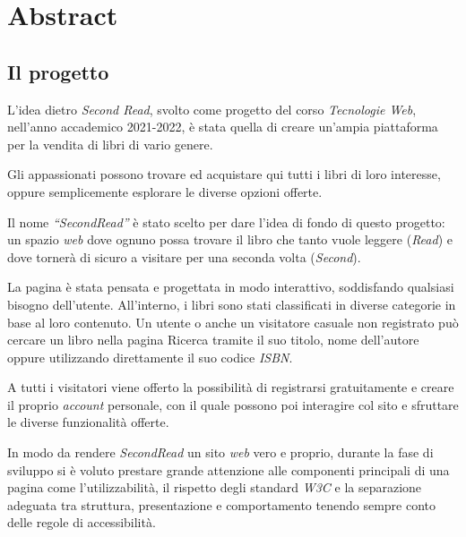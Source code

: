 \section{Abstract}\label{sec:abstract}

\subsection{Il progetto}
L’idea dietro \textit{Second Read}, svolto come progetto del corso \textit{Tecnologie Web}, nell’anno accademico 2021-2022, è stata quella di creare un’ampia piattaforma per la vendita di libri di vario genere.

Gli appassionati possono trovare ed acquistare qui tutti i libri di loro interesse, oppure semplicemente esplorare le diverse opzioni offerte.

Il nome \textit{“SecondRead”} è stato scelto per dare l’idea di fondo di questo progetto: un spazio \textit{web} dove ognuno possa trovare il libro che tanto vuole leggere (\textit{Read}) e dove tornerà di sicuro a visitare per una seconda volta (\textit{Second}).

La pagina è stata pensata e progettata in modo interattivo, soddisfando qualsiasi bisogno dell'utente. All'interno, i libri sono stati classificati in diverse categorie in base al loro contenuto. Un utente o anche un visitatore casuale non registrato può cercare un libro nella pagina Ricerca tramite il suo titolo, nome dell'autore oppure utilizzando direttamente il suo codice \textit{ISBN}.

A tutti i visitatori viene offerto la possibilità di registrarsi gratuitamente e creare il proprio \textit{account} personale, con il quale possono poi interagire col sito e sfruttare le diverse funzionalità offerte.

In modo da rendere \textit{SecondRead} un sito \textit{web} vero e proprio, durante la fase di sviluppo si è voluto prestare grande attenzione alle componenti principali di una pagina come l'utilizzabilità, il rispetto degli standard \textit{W3C} e la separazione adeguata tra struttura, presentazione e comportamento tenendo sempre conto delle regole di accessibilità.